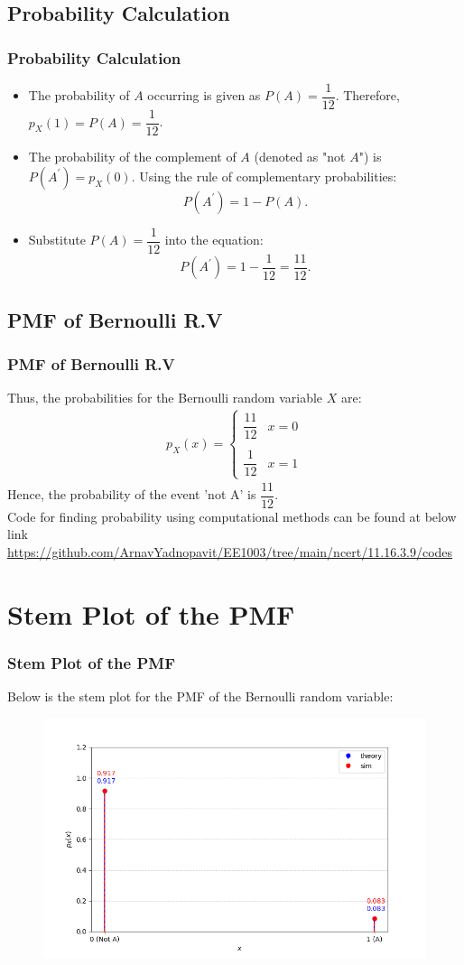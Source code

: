 \documentclass{beamer}
\numberwithin{equation}{section}
\begin{document}
\subsection{Probability Calculation}
\begin{frame}
\frametitle{Probability Calculation}
\begin{itemize}
    \item The probability of $ A $ occurring is given as $ P(A) = \dfrac{1}{12} $.  
    Therefore, $ p_X(1) = P(A) = \dfrac{1}{12} $.

    \item The probability of the complement of $ A $ (denoted as "not $ A $") is $ P(A^\prime) = p_X(0) $. Using the rule of complementary probabilities:
    \[
    P(A^\prime) = 1 - P(A).
    \]

    \item Substitute $ P(A) = \dfrac{1}{12} $ into the equation:
    \[
    P(A^\prime) = 1 - \dfrac{1}{12} = \dfrac{11}{12}.
    \]
\end{itemize}
\end{frame}

\subsection{PMF of Bernoulli R.V}
\begin{frame}
\frametitle{PMF of Bernoulli R.V}
Thus, the probabilities for the Bernoulli random variable $ X $ are:
\begin{align}
  p_X(x) = \begin{cases}
    \dfrac{11}{12} & x = 0\\\\
    \dfrac{1}{12} & x = 1
  \end{cases}
\end{align}
Hence, the probability of the event 'not A' is $\dfrac{11}{12}$.\\
Code for finding probability using computational methods can be found at below link\\
\url{https://github.com/ArnavYadnopavit/EE1003/tree/main/ncert/11.16.3.9/codes}
\end{frame}

\section{Stem Plot of the PMF}
\begin{frame}
\frametitle{Stem Plot of the PMF}
Below is the stem plot for the PMF of the Bernoulli random variable:
\begin{figure}[h]
    \centering
    \includegraphics[width=0.8\linewidth]{figs/fig.png}
\end{figure}
\end{frame}
\end{document}
